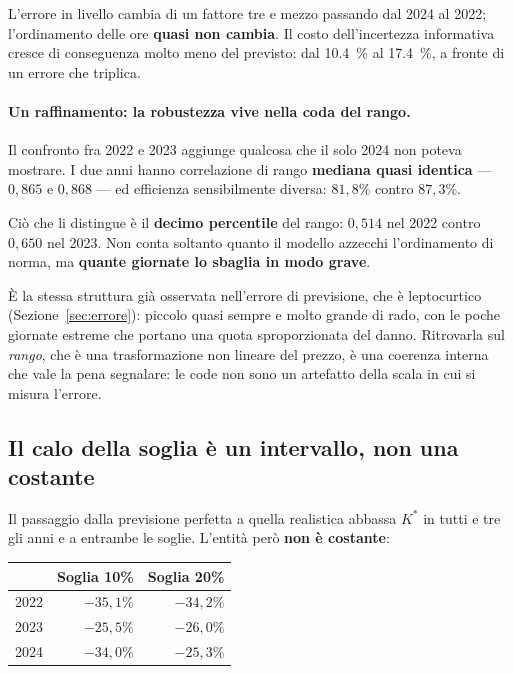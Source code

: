 L'errore in livello cambia di un fattore tre e mezzo passando dal 2024 al 2022; l'ordinamento
delle ore \textbf{quasi non cambia}. Il costo dell'incertezza informativa cresce di conseguenza
molto meno del previsto: dal \SI{10,4}{\percent} al \SI{17,4}{\percent}, a fronte di un errore
che triplica.

\paragraph{Un raffinamento: la robustezza vive nella coda del rango.} Il confronto fra 2022 e
2023 aggiunge qualcosa che il solo 2024 non poteva mostrare. I due anni hanno correlazione di
rango \textbf{mediana quasi identica} --- $0{,}865$ e $0{,}868$ --- ed efficienza sensibilmente
diversa: $81{,}8\%$ contro $87{,}3\%$.

Ci\`o che li distingue \`e il \textbf{decimo percentile} del rango: $0{,}514$ nel 2022 contro
$0{,}650$ nel 2023. Non conta soltanto quanto il modello azzecchi l'ordinamento di norma, ma
\textbf{quante giornate lo sbaglia in modo grave}.

\`E la stessa struttura gi\`a osservata nell'errore di previsione, che \`e leptocurtico
(Sezione~\ref{sec:errore}): piccolo quasi sempre e molto grande di rado, con le poche giornate
estreme che portano una quota sproporzionata del danno. Ritrovarla sul \emph{rango}, che \`e
una trasformazione non lineare del prezzo, \`e una coerenza interna che vale la pena
segnalare: le code non sono un artefatto della scala in cui si misura l'errore.

\subsection{Il calo della soglia \`e un intervallo, non una costante}

Il passaggio dalla previsione perfetta a quella realistica abbassa $K^*$ in tutti e tre gli
anni e a entrambe le soglie. L'entit\`a per\`o \textbf{non \`e costante}:

\begin{center}
\begin{tabular}{@{}lrr@{}}
\toprule
 & \textbf{Soglia 10\%} & \textbf{Soglia 20\%} \\
\midrule
2022 & $-35{,}1\%$ & $-34{,}2\%$ \\
2023 & $-25{,}5\%$ & $-26{,}0\%$ \\
2024 & $-34{,}0\%$ & $-25{,}3\%$ \\
\bottomrule
\end{tabular}
\end{center}


